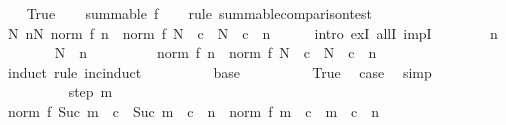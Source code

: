 \begin{isabellebody}
\ \ \isamarkupfalse%
\ True\isanewline
\ \ \isamarkupfalse%
\ {\isachardoublequoteopen}summable\ f{\isachardoublequoteclose}\isanewline
\ \ \isamarkupfalse%
\ {\isacharparenleft}{\kern0pt}rule\ summable{\isacharunderscore}{\kern0pt}comparison{\isacharunderscore}{\kern0pt}test{\isacharparenright}{\kern0pt}\isanewline
\ \ \ \ \isamarkupfalse%
\ {\isachardoublequoteopen}{\isasymexists}N{\isacharprime}{\kern0pt}{\isachardot}{\kern0pt}\ {\isasymforall}n{\isasymge}N{\isacharprime}{\kern0pt}{\isachardot}{\kern0pt}\ norm\ {\isacharparenleft}{\kern0pt}f\ n{\isacharparenright}{\kern0pt}\ {\isasymle}\ {\isacharparenleft}{\kern0pt}norm\ {\isacharparenleft}{\kern0pt}f\ N{\isacharparenright}{\kern0pt}\ {\isacharslash}{\kern0pt}\ {\isacharparenleft}{\kern0pt}c\ {\isacharcircum}{\kern0pt}\ N{\isacharparenright}{\kern0pt}{\isacharparenright}{\kern0pt}\ {\isacharasterisk}{\kern0pt}\ c\ {\isacharcircum}{\kern0pt}\ n{\isachardoublequoteclose}\isanewline
\ \ \ \ \isamarkupfalse%
\ {\isacharparenleft}{\kern0pt}intro\ exI\ allI\ impI{\isacharparenright}{\kern0pt}\isanewline
\ \ \ \ \ \ \isamarkupfalse%
\ n\isanewline
\ \ \ \ \ \ \isamarkupfalse%
\ {\isachardoublequoteopen}N\ {\isasymle}\ n{\isachardoublequoteclose}\isanewline
\ \ \ \ \ \ \isamarkupfalse%
\ \isamarkupfalse%
\ {\isachardoublequoteopen}norm\ {\isacharparenleft}{\kern0pt}f\ n{\isacharparenright}{\kern0pt}\ {\isasymle}\ {\isacharparenleft}{\kern0pt}norm\ {\isacharparenleft}{\kern0pt}f\ N{\isacharparenright}{\kern0pt}\ {\isacharslash}{\kern0pt}\ {\isacharparenleft}{\kern0pt}c\ {\isacharcircum}{\kern0pt}\ N{\isacharparenright}{\kern0pt}{\isacharparenright}{\kern0pt}\ {\isacharasterisk}{\kern0pt}\ c\ {\isacharcircum}{\kern0pt}\ n{\isachardoublequoteclose}\isanewline
\ \ \ \ \ \ \isamarkupfalse%
\ {\isacharparenleft}{\kern0pt}induct\ rule{\isacharcolon}{\kern0pt}\ inc{\isacharunderscore}{\kern0pt}induct{\isacharparenright}{\kern0pt}\isanewline
\ \ \ \ \ \ \ \ \isamarkupfalse%
\ base\isanewline
\ \ \ \ \ \ \ \ \isamarkupfalse%
\ True\ \isamarkupfalse%
\ {\isacharquery}{\kern0pt}case\ \isamarkupfalse%
\ simp\isanewline
\ \ \ \ \ \ \isamarkupfalse%
\isanewline
\ \ \ \ \ \ \ \ \isamarkupfalse%
\ {\isacharparenleft}{\kern0pt}step\ m{\isacharparenright}{\kern0pt}\isanewline
\ \ \ \ \ \ \ \ \isamarkupfalse%
\ {\isachardoublequoteopen}norm\ {\isacharparenleft}{\kern0pt}f\ {\isacharparenleft}{\kern0pt}Suc\ m{\isacharparenright}{\kern0pt}{\isacharparenright}{\kern0pt}\ {\isacharslash}{\kern0pt}\ c\ {\isacharcircum}{\kern0pt}\ Suc\ m\ {\isacharasterisk}{\kern0pt}\ c\ {\isacharcircum}{\kern0pt}\ n\ {\isasymle}\ norm\ {\isacharparenleft}{\kern0pt}f\ m{\isacharparenright}{\kern0pt}\ {\isacharslash}{\kern0pt}\ c\ {\isacharcircum}{\kern0pt}\ m\ {\isacharasterisk}{\kern0pt}\ c\ {\isacharcircum}{\kern0pt}\ n{\isachardoublequoteclose}\isanewline

\end{isabellebody}
